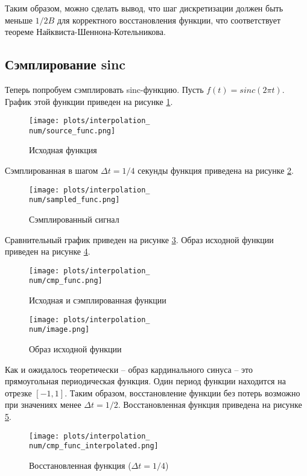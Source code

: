 Таким образом, можно сделать вывод, что шаг дискретизации должен быть меньше $1/2B$ для корректного восстановления функции, что
соответствует теореме Найквиста-Шеннона-Котельникова.

\subsection{Сэмплирование sinc}
\def\num{4}
Теперь попробуем сэмплировать sinc-функцию. Пусть $f(t) = sinc(2\pi t)$. График этой функции приведен на рисунке \ref{fig:source_func\num}.
\begin{figure}[ht!]
    \centering
    \texttt{[image: plots/interpolation\_\\num/source\_func.png]}
    \caption{Исходная функция}
    \label{fig:source_func\num}
\end{figure}

Сэмплированная в шагом $\Delta t = 1/4$ секунды функция приведена на рисунке \ref{fig:sampled_func\num}.
\begin{figure}[ht!]
    \centering
    \texttt{[image: plots/interpolation\_\\num/sampled\_func.png]}
    \caption{Сэмплированный сигнал}
    \label{fig:sampled_func\num}
\end{figure}

Сравнительный график приведен на рисунке \ref{fig:source_sampled_func\num}.
Образ исходной функции приведен на рисунке \ref{fig:image\num}.
\begin{figure}[ht!]
    \centering
    \texttt{[image: plots/interpolation\_\\num/cmp\_func.png]}
    \caption{Исходная и сэмплированная функции}
    \label{fig:source_sampled_func\num}
\end{figure}

\begin{figure}[ht!]
    \centering
    \texttt{[image: plots/interpolation\_\\num/image.png]}
    \caption{Образ исходной функции}
    \label{fig:image\num}
\end{figure}

Как и ожидалось теоретически -- образ кардинального синуса -- это прямоугольная периодическая функция. 
Один период функции находится на отрезке $[-1, 1]$. Таким образом, восстановление функции без потерь возможно при значениях менее $\Delta t = 1/2$.
Восстановленная функция приведена на рисунке \ref{fig:interpolated_func\num}.
\begin{figure}[ht!]
    \centering
    \texttt{[image: plots/interpolation\_\\num/cmp\_func\_interpolated.png]}
    \caption{Восстановленная функция ($\Delta t = 1/4$)}
    \label{fig:interpolated_func\num}
\end{figure}

